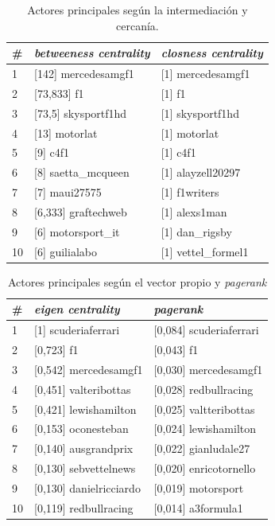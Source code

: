 \begin{table}[H]
	\centering
	\caption{Actores principales según la intermediación y cercanía.}
	\label{tab:actores-principales-intermediacion-cercania}
	\begin{tabular}{| l | l l |}
		\hline
		\# & \textit{betweeness centrality} & \textit{closness centrality} \\
		\hline 
		1  & [142] mercedesamgf1            & [1] mercedesamgf1            \\
		2  & [73,833] f1                    & [1] f1                       \\
		3  & [73,5] skysportf1hd            & [1] skysportf1hd             \\
		4  & [13] motorlat                  & [1] motorlat                 \\
		5  & [9] c4f1                       & [1] c4f1                     \\
		6  & [8] saetta\_mcqueen            & [1] alayzell20297            \\
		7  & [7] maui27575                  & [1] f1writers                \\
		8  & [6,333] graftechweb            & [1] alexs1man                \\
		9  & [6] motorsport\_it             & [1] dan\_rigsby              \\
		10 & [6] guilialabo                 & [1] vettel\_formel1          \\
		\hline
	\end{tabular}
\end{table}

\begin{table}[H]
	\centering
	\caption{Actores principales según el vector propio y \textit{pagerank}}
	\label{tab:actores-principales-vector-propio}
	\begin{tabular}{| l | l l |}
		\hline
		\# & \textit{eigen centrality} & \textit{pagerank}       \\
		\hline 
		1  & [1] scuderiaferrari       & [0,084] scuderiaferrari \\
		2  & [0,723] f1                & [0,043] f1              \\
		3  & [0,542] mercedesamgf1     & [0,030] mercedesamgf1   \\
		4  & [0,451] valteribottas     & [0,028] redbullracing   \\
		5  & [0,421] lewishamilton     & [0,025] valtteribottas  \\
		6  & [0,153] oconesteban       & [0,024] lewishamilton   \\
		7  & [0,140] ausgrandprix      & [0,022] gianludale27    \\
		8  & [0,130] sebvettelnews     & [0,020] enricotornello  \\
		9  & [0,130] danielricciardo   & [0,019] motorsport      \\
		10 & [0,119] redbullracing     & [0,014] a3formula1      \\
		\hline
	\end{tabular}
\end{table}

